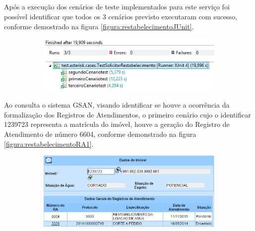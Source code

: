		
\subsection{\fontsize{12}{1} }

 Após a execução dos cenários de teste implementados para este serviço foi possível identificar que todos os 3 cenários previsto executaram com sucesso, conforme demostrado na figura \ref{figura:restabelecimentoJUnit}.	

\begin{figure}[H]
	\centering
	\caption{\textbf{Restabelecimento da Ligação de Água - Detalhes execução dos testes}}
	\label{figura:restabelecimentoJUnit}
	\begin{subfigure}[H]{\textwidth}
		\centering
		\includegraphics{figuras/cenarios/restabelecimento/junit_result.PNG}
	\end{subfigure}
\end{figure}

Ao consulta o sistema GSAN, visando identificar se houve a ocorrência da formalização dos Registros de Atendimentos, o primeiro cenário cujo o identificar 1239723 representa a matrícula do imóvel, houve a geração do Registro de Atendimento de número 6604, conforme demonstrado na figura \ref{figura:restabelecimentoRA1}.

\begin{figure}[H]
	\centering
	\caption{\textbf{Restabelecimento da Ligação de Água - RA gerado para o Cenário 1}}
	\label{figura:restabelecimentoRA1}
	\begin{subfigure}[H]{\textwidth}
		\centering
		\includegraphics{figuras/cenarios/restabelecimento/resultado_1.PNG}
	\end{subfigure}
\end{figure}


